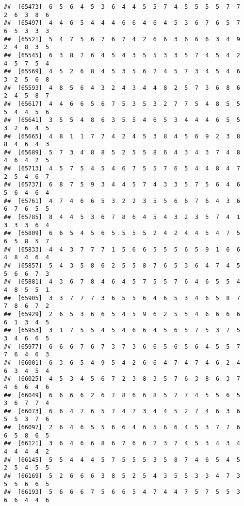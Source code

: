\documentclass[
]{book}
\begin{document}
\begin{verbatim}
##  [65473]  6  5  6  4  5  3  6  4  4  5  5  7  4  5  5  5  5  7  7  2  6  3  8  6
##  [65497]  4  4  6  5  4  4  4  6  6  4  6  4  5  3  6  7  6  5  7  6  5  3  3  3
##  [65521]  5  4  7  5  6  7  6  7  4  2  6  6  3  6  6  6  3  4  9  2  4  8  3  5
##  [65545]  6  3  8  7  6  4  5  4  3  5  5  3  3  5  7  4  5  4  2  4  5  7  5  4
##  [65569]  4  5  2  6  8  4  5  3  5  6  2  4  5  7  3  4  5  4  6  3  2  5  6  8
##  [65593]  4  8  5  6  4  3  2  4  3  4  4  8  2  5  7  3  6  8  6  2  4  5  8  7
##  [65617]  4  4  6  6  5  6  7  5  3  5  3  2  7  7  5  4  8  5  5  5  4  4  5  6
##  [65641]  3  5  5  4  8  6  3  5  5  4  6  5  3  4  4  4  6  5  5  3  2  6  4  5
##  [65665]  4  8  1  1  7  7  4  2  4  5  3  8  4  5  6  9  2  3  8  8  4  6  4  3
##  [65689]  5  7  3  4  8  8  5  2  5  5  8  6  4  3  4  3  7  4  8  4  6  4  2  5
##  [65713]  4  5  7  5  4  5  4  6  7  5  5  7  6  5  4  4  8  4  7  2  5  4  6  7
##  [65737]  6  8  7  5  9  3  4  4  5  7  4  3  3  5  7  5  6  4  6  5  6  4  6  4
##  [65761]  4  7  4  6  6  5  3  2  2  3  5  5  6  6  7  6  4  3  6  6  7  6  5  5
##  [65785]  8  4  4  5  3  6  7  8  6  4  5  4  3  2  3  5  7  4  1  3  3  3  6  4
##  [65809]  6  6  5  4  5  6  5  5  5  5  2  4  2  4  4  5  4  7  5  6  5  8  5  7
##  [65833]  4  4  3  7  7  7  1  5  6  6  5  5  5  6  5  9  1  6  6  4  8  4  6  4
##  [65857]  5  4  3  5  8  6  2  5  5  8  7  6  5  3  6  4  7  4  5  5  6  6  7  3
##  [65881]  4  3  6  7  8  4  6  4  5  7  5  5  7  6  4  6  5  5  4  4  8  5  5  1
##  [65905]  3  3  7  7  7  3  6  5  5  6  4  6  5  3  4  6  5  8  7  7  8  6  7  2
##  [65929]  2  6  5  3  6  6  5  4  5  9  6  2  5  5  4  6  6  6  6  6  1  3  4  5
##  [65953]  3  1  7  5  5  4  5  4  6  6  4  5  6  5  7  5  3  7  5  3  4  6  6  5
##  [65977]  6  6  6  7  6  7  3  7  3  6  6  5  6  5  6  4  5  5  7  7  6  4  6  3
##  [66001]  6  3  6  5  4  9  5  4  2  6  6  4  7  4  7  4  6  2  4  6  3  4  5  4
##  [66025]  4  5  3  4  5  6  7  2  3  8  3  5  7  6  3  8  6  3  7  4  6  6  4  6
##  [66049]  6  6  6  6  2  6  7  8  6  6  8  5  7  7  4  5  5  6  5  3  6  7  7  4
##  [66073]  6  6  4  7  6  5  7  4  7  3  4  4  5  2  7  4  6  3  6  5  5  3  7  6
##  [66097]  2  6  4  6  5  5  6  6  4  6  5  6  6  4  5  3  7  7  6  6  5  8  6  5
##  [66121]  3  6  4  6  6  8  6  7  6  6  2  3  7  4  5  3  4  3  4  4  4  4  4  2
##  [66145]  5  5  4  4  4  5  7  5  5  5  3  5  8  7  4  6  5  4  5  2  5  4  5  5
##  [66169]  5  2  6  6  6  3  8  5  2  5  4  3  5  5  3  3  4  7  3  5  5  6  6  5
##  [66193]  5  6  6  6  7  5  6  6  5  4  7  4  4  7  5  7  5  5  3  6  6  4  4  6

\end{verbatim}
\end{document}

